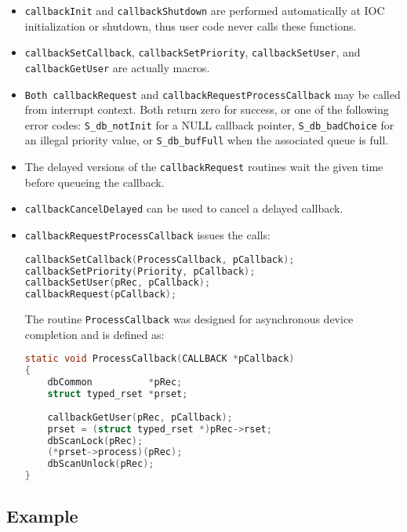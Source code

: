 \begin{itemize}
\item \verb|callbackInit| and \verb|callbackShutdown| are performed automatically at IOC initialization or shutdown,
thus user code never calls these functions.

\item \verb|callbackSetCallback|, \verb|callbackSetPriority|, \verb|callbackSetUser|, and \verb|callbackGetUser| are 
actually macros.

\item \verb|Both callbackRequest| and \verb|callbackRequestProcessCallback| may be called from interrupt context. Both return zero for success, or one of the following error codes: \verb|S_db_notInit| for a NULL callback pointer, \verb|S_db_badChoice| for an illegal priority value, or \verb|S_db_bufFull| when the associated queue is full.

\item The delayed versions of the \verb|callbackRequest| routines wait the given time before queueing the callback.

\item \verb|callbackCancelDelayed| can be used to cancel a delayed callback.

\item \verb|callbackRequestProcessCallback| issues the calls:

\begin{lstlisting}[language=C]
callbackSetCallback(ProcessCallback, pCallback);
callbackSetPriority(Priority, pCallback);
callbackSetUser(pRec, pCallback);
callbackRequest(pCallback);
\end{lstlisting}

The routine \verb|ProcessCallback| was designed for asynchronous device completion and is defined as:

\begin{lstlisting}[language=C]
static void ProcessCallback(CALLBACK *pCallback)
{
    dbCommon          *pRec;
    struct typed_rset *prset;
 
    callbackGetUser(pRec, pCallback);
    prset = (struct typed_rset *)pRec->rset;
    dbScanLock(pRec);
    (*prset->process)(pRec);
    dbScanUnlock(pRec);
}
\end{lstlisting}

\end{itemize}

\subsection{Example}

